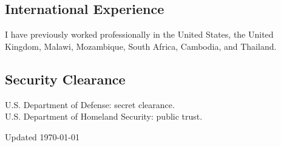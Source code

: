 \documentclass[11pt,letterpaper]{report}
\renewenvironment{itemize}{
  \begin{list}{}{
      \setlength{\leftmargin}{1.75em}
      \setlength{\itemsep}{0.25em}
      \setlength{\parskip}{0em}
      \setlength{\parsep}{0.25em}
    }
}{
  \end{list}
}
\begin{document}
\subsection*{International Experience}

\begin{itemize}
\item I have previously worked professionally in the United States, the United Kingdom, Malawi, Mozambique, South Africa, Cambodia, and Thailand.
\end{itemize}

\subsection*{Security Clearance}

\begin{itemize}
\item U.S. Department of Defense: secret clearance.\\U.S. Department of Homeland Security: public trust.
\end{itemize}


\begin{center}
\vspace{6em}
Updated \monthyeardate\today
\end{center} 
\end{document}
